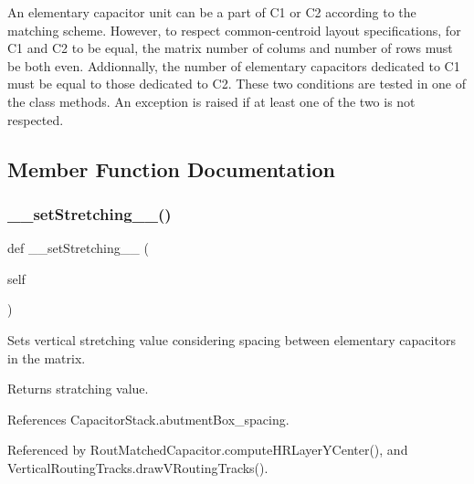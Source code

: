An elementary capacitor unit can be a part of C1 or C2 according to the matching scheme. However, to respect common-\/centroid layout specifications, for C1 and C2 to be equal, the matrix number of colums and number of rows must be both even. Addionnally, the number of elementary capacitors dedicated to C1 must be equal to those dedicated to C2. These two conditions are tested in one of the class methods. An exception is raised if at least one of the two is not respected. 

\subsection{Member Function Documentation}
\mbox{\label{classpython_1_1capacitorvrtracks_1_1VerticalRoutingTracks_a0196828def1b7ed08eb1bfe027cf4692}} 
\subsubsection{\texorpdfstring{\+\_\+\+\_\+set\+Stretching\+\_\+\+\_\+()}{\_\_setStretching\_\_()}}
{\footnotesize\ttfamily def \+\_\+\+\_\+set\+Stretching\+\_\+\+\_\+ (\begin{DoxyParamCaption}\item[{}]{self }\end{DoxyParamCaption})}



Sets vertical stretching value considering spacing between elementary capacitors in the matrix. 

\begin{DoxyReturn}{Returns}
stratching value. 
\end{DoxyReturn}


References Capacitor\+Stack.\+abutment\+Box\+\_\+spacing.



Referenced by Rout\+Matched\+Capacitor.\+compute\+H\+R\+Layer\+Y\+Center(), and Vertical\+Routing\+Tracks.\+draw\+V\+Routing\+Tracks().

\mbox{\label{classpython_1_1capacitorvrtracks_1_1VerticalRoutingTracks_a458149b1404a0e797668330beb75b640}} 
